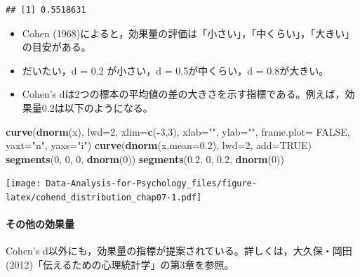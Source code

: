 \documentclass[]{article}
\newenvironment{Shaded}{\begin{snugshade}}{\end{snugshade}}
\newcommand{\KeywordTok}[1]{\textcolor[rgb]{0.13,0.29,0.53}{\textbf{#1}}}
\newcommand{\DataTypeTok}[1]{\textcolor[rgb]{0.13,0.29,0.53}{#1}}
\newcommand{\DecValTok}[1]{\textcolor[rgb]{0.00,0.00,0.81}{#1}}
\newcommand{\FloatTok}[1]{\textcolor[rgb]{0.00,0.00,0.81}{#1}}
\newcommand{\StringTok}[1]{\textcolor[rgb]{0.31,0.60,0.02}{#1}}
\newcommand{\OtherTok}[1]{\textcolor[rgb]{0.56,0.35,0.01}{#1}}
\newcommand{\OperatorTok}[1]{\textcolor[rgb]{0.81,0.36,0.00}{\textbf{#1}}}
\newcommand{\NormalTok}[1]{#1}
\providecommand{\tightlist}{%
  \setlength{\itemsep}{0pt}\setlength{\parskip}{0pt}}
\let\oldparagraph\paragraph
\renewcommand{\paragraph}[1]{\oldparagraph{#1}\mbox{}}
\begin{document}
\begin{verbatim}
## [1] 0.5518631
\end{verbatim}

\begin{itemize}
\tightlist
\item
  Cohen
  (1968)によると，効果量の評価は「小さい」，「中くらい」，「大きい」の目安がある。\\
\item
  だいたい，d = 0.2 が小さい，d = 0.5が中くらい，d = 0.8が大きい。\\
\item
  Cohen's
  dは2つの標本の平均値の差の大きさを示す指標である。例えば，効果量0.2は以下のようになる。
\end{itemize}

\begin{Shaded}
\begin{Highlighting}[]
\KeywordTok{curve}\NormalTok{(}\KeywordTok{dnorm}\NormalTok{(x), }\DataTypeTok{lwd=}\DecValTok{2}\NormalTok{, }\DataTypeTok{xlim=}\KeywordTok{c}\NormalTok{(}\OperatorTok{-}\DecValTok{3}\NormalTok{,}\DecValTok{3}\NormalTok{),}
      \DataTypeTok{xlab=}\StringTok{""}\NormalTok{, }\DataTypeTok{ylab=}\StringTok{""}\NormalTok{, }\DataTypeTok{frame.plot=} \OtherTok{FALSE}\NormalTok{, }\DataTypeTok{yaxt=}\StringTok{"n"}\NormalTok{, }\DataTypeTok{yaxs=}\StringTok{"i"}\NormalTok{)}
\KeywordTok{curve}\NormalTok{(}\KeywordTok{dnorm}\NormalTok{(x,}\DataTypeTok{mean=}\FloatTok{0.2}\NormalTok{), }\DataTypeTok{lwd=}\DecValTok{2}\NormalTok{, }\DataTypeTok{add=}\OtherTok{TRUE}\NormalTok{)}
\KeywordTok{segments}\NormalTok{(}\DecValTok{0}\NormalTok{, }\DecValTok{0}\NormalTok{, }\DecValTok{0}\NormalTok{, }\KeywordTok{dnorm}\NormalTok{(}\DecValTok{0}\NormalTok{))}
\KeywordTok{segments}\NormalTok{(}\FloatTok{0.2}\NormalTok{, }\DecValTok{0}\NormalTok{, }\FloatTok{0.2}\NormalTok{, }\KeywordTok{dnorm}\NormalTok{(}\DecValTok{0}\NormalTok{))}
\end{Highlighting}
\end{Shaded}

\texttt{[image: Data-Analysis-for-Psychology\_files/figure-latex/cohend\_distribution\_chap07-1.pdf]}

\paragraph{その他の効果量}

Cohen's
d以外にも，効果量の指標が提案されている。詳しくは，大久保・岡田(2012)「伝えるための心理統計学」の第3章を参照。
\end{document}
